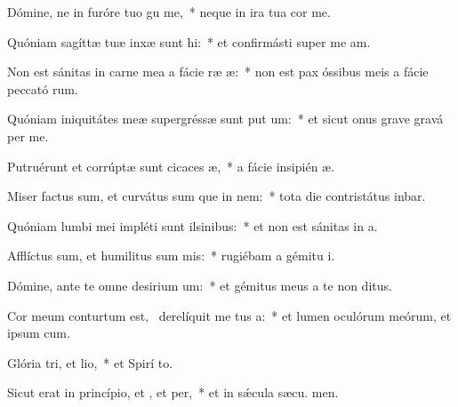\item Dómine, ne in furóre tuo gu me,~* neque in ira tua cor me.
\item Quóniam sagíttæ tuæ inxæ sunt hi:~* et confirmásti super me  am.
\item Non est sánitas in carne mea a fácie ræ æ:~* non est pax óssibus meis a fácie peccató rum.
\item Quóniam iniquitátes meæ supergréssæ sunt put um:~* et sicut onus grave gravá  per me.
\item Putruérunt et corrúptæ sunt cicaces æ,~* a fácie insipién æ.
\item Miser factus sum, et curvátus sum que in nem:~* tota die contristátus inbar.
\item Quóniam lumbi mei impléti sunt ilsinibus:~* et non est sánitas in  a.
\item Afflíctus sum, et humilitus sum mis:~* rugiébam a gémitu  i.
\item Dómine, ante te omne desirium um:~* et gémitus meus a te non  ditus.
\item Cor meum conturtum est,~\pscross{} derelíquit me tus a:~* et lumen oculórum meórum, et ipsum   cum.
\item Glória tri, et lio,~* et Spirí to.
\item Sicut erat in princípio, et , et per,~* et in sǽcula sæcu. men.
